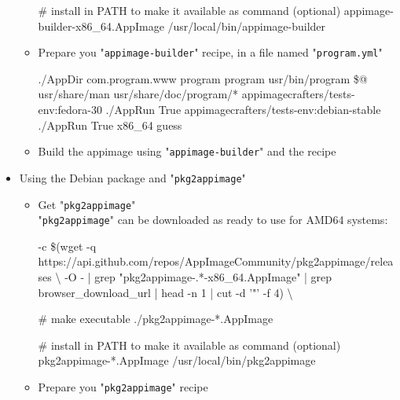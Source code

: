 \begin{itemize}
\begin{itemize}
{{\begin{scriptii}
# install in PATH to make it available as command (optional)
  appimage-builder-x86\_64.AppImage /usr/local/bin/appimage-builder
\end{scriptii}
}}
\item Prepare you "\texttt{appimage-builder}" recipe, in a file named "\texttt{program.yml}" 
{\footnotesize{
\begin{scriptii}
 
   ./AppDir
     com.program.www
     program
     program
     
     usr/bin/program
     \$@
    \bbtt{-} usr/share/man
    \bbtt{-} usr/share/doc/program/* 
       appimagecrafters/tests-env:fedora-30
       ./AppRun
       True
       appimagecrafters/tests-env:debian-stable
       ./AppRun
       True
   x86\_64
   guess
\end{scriptii}
}}
\item Build the appimage using "\texttt{appimage-builder}" and the recipe
{\footnotesize{
\begin{scriptii}
  
\end{scriptii}
}}
\end{itemize}
\item Using the Debian package and "\texttt{pkg2appimage}"
\begin{itemize}
\item Get "\texttt{pkg2appimage}" \\[0.5cm]
"\texttt{pkg2appimage}" can be downloaded as ready to use for AMD64 systems:
{\tiny{
\begin{scriptii}
 -c \$(wget -q https://api.github.com/repos/AppImageCommunity/pkg2appimage/releases \textbackslash
-O - | grep "pkg2appimage-.*-x86\_64.AppImage" | grep browser\_download\_url | head -n 1 | cut -d '"' -f 4) \textbackslash

# make executable
  ./pkg2appimage-*.AppImage

# install in PATH to make it available as command (optional)
  pkg2appimage-*.AppImage /usr/local/bin/pkg2appimage
\end{scriptii}
}}
\item Prepare you "\texttt{pkg2appimage}" recipe
\end{itemize}
\end{itemize}
